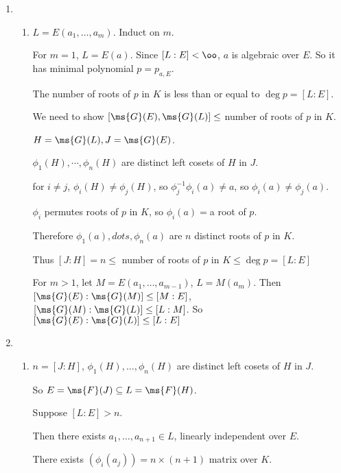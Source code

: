 \documentclass[x11names,reqno,14pt]{extarticle}
\begin{document}
\begin{enumerate}

\item 

\begin{enumerate}[label=(\alph*)]

\item $L = E(a_1, \dots, a_m)$. Induct on $m$. 

For $m = 1$, $L = E(a)$. Since $[L:E] < \oo$, $a$ is algebraic over $E$. So it has minimal polynomial $p = p_{a,E}$. 

The number of roots of $p$ in $K$ is less than or equal to $\deg p = [L:E]$. 

We need to show $[\ms{G}(E), \ms{G}(L)] \leq$ number of roots of $p$ in $K$. 

$H = \ms{G}(L), J = \ms{G}(E)$. 

$\phi_1(H), \cdots, \phi_n(H)$ are distinct left cosets of $H$ in $J$. 

for $i \neq j$, $\phi_i(H) \neq \phi_j(H)$, so $\phi_j^{-1}\phi_i(a) \neq a$, so $\phi_i(a) \neq \phi_j(a)$. 

$\phi_i$ permutes roots of $p$ in $K$, so $\phi_i(a) = $a root of $p$. 

Therefore $\phi_1(a), dots, \phi_n(a)$ are $n$ distinct roots of $p$ in $K$. 

Thus $[J:H] = n \leq $ number of roots of $p$ in $K \leq \deg p = [L:E] $

For $m > 1$, let $M = E(a_1, \dots, a_{m - 1})$, $L = M(a_m)$. Then $[\ms{G}(E):\ms{G}(M)] \leq [M:E]$, 
$[\ms{G}(M):\ms{G}(L)] \leq [L:M]$.
So $[\ms{G}(E):\ms{G}(L)] \leq [L:E]$

\end{enumerate}

\item 

\begin{enumerate}[label=(\alph*)]

\item $n = [J:H]$, $\phi_1(H),\dots, \phi_n(H)$ are distinct left cosets of $H$ in $J$. 

So $E = \ms{F}(J) \subseteq L = \ms{F}(H)$. 

Suppose $[L:E]> n$. 

Then there exists $a_1, \dots, a_{n + 1} \in L$, linearly independent over $E$. 

There exists $(\phi_i(a_j)) = n\times(n + 1)$ matrix over $K$. 

\end{enumerate}



\end{enumerate}
\end{document}
